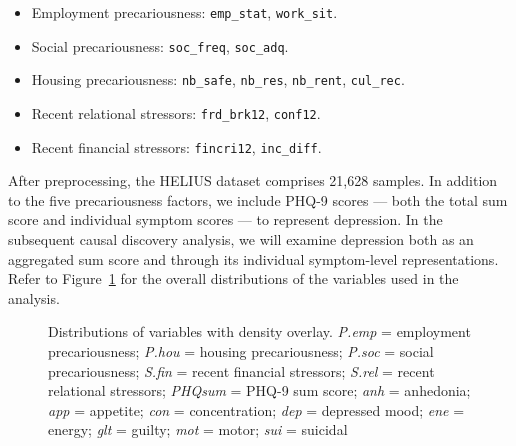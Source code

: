 \documentclass[
]{article}
\providecommand{\tightlist}{%
  \setlength{\itemsep}{0pt}\setlength{\parskip}{0pt}}\usepackage{longtable,booktabs,array}
\begin{document}
\begin{itemize}
\tightlist
\item
  Employment precariousness: \texttt{emp\_stat}, \texttt{work\_sit}.
\item
  Social precariousness: \texttt{soc\_freq}, \texttt{soc\_adq}.
\item
  Housing precariousness: \texttt{nb\_safe}, \texttt{nb\_res},
  \texttt{nb\_rent}, \texttt{cul\_rec}.
\item
  Recent relational stressors: \texttt{frd\_brk12}, \texttt{conf12}.
\item
  Recent financial stressors: \texttt{fincri12}, \texttt{inc\_diff}.
\end{itemize}

After preprocessing, the HELIUS dataset comprises 21,628 samples. In
addition to the five precariousness factors, we include PHQ-9 scores ---
both the total sum score and individual symptom scores --- to represent
depression. In the subsequent causal discovery analysis, we will examine
depression both as an aggregated sum score and through its individual
symptom-level representations. Refer to Figure~\ref{fig-dist} for the
overall distributions of the variables used in the analysis.

\begin{figure}


\caption{\label{fig-dist}Distributions of variables with density
overlay. \emph{P.emp} = employment precariousness; \emph{P.hou} =
housing precariousness; \emph{P.soc} = social precariousness;
\emph{S.fin} = recent financial stressors; \emph{S.rel} = recent
relational stressors; \emph{PHQsum} = PHQ-9 sum score; \emph{anh} =
anhedonia; \emph{app} = appetite; \emph{con} = concentration; \emph{dep}
= depressed mood; \emph{ene} = energy; \emph{glt} = guilty; \emph{mot} =
motor; \emph{sui} = suicidal}

\end{figure}%
\end{document}

